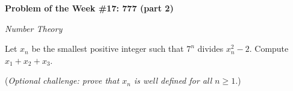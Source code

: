 \begin{potw}\vspace{5pt}
{\large\textbf{Problem of the Week \#17: 777 (part 2)}}\vspace{5pt}

\textit{Number Theory}\V

Let $x_n$ be the smallest positive integer such that $7^n$ divides $x_n^2-2$. Compute $x_1+x_2+x_3$. \V

(\textit{Optional challenge: prove that $x_n$ is well defined for all $n\geq 1$}.)
\end{potw}\V
